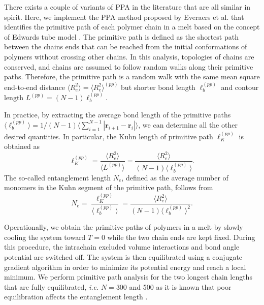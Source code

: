 \documentclass[pre,showpacs,notitlepage,twocolumn]{revtex4-1}
\begin{document}
There exists  a couple of variants of  PPA  in the literature \cite{Kroger,Hoy2009,PPAEveraers} that   are all similar in spirit. Here, we implement the  PPA method proposed by Everaers et al. \cite{PPAEveraers}
that  identifies the primitive path of each polymer chain in
a melt based on the concept of Edwards tube model \cite{Edwardstube}.
The primitive path is defined as the shortest path between the chains ends 
that can be  reached from the initial conformations of polymers without crossing other chains.  In this analysis, topologies of chains are conserved, and chains are assumed to follow
random walks along their primitive paths. Therefore, the primitive path is a random walk with the same mean square end-to-end distance $ \langle R_e^2 \rangle= \langle R_e^2 \rangle^{(pp)}$  but  shorter 
bond  length  $\ell_b^{(pp)}$ and contour length $L^{(pp)}=(N-1)\ell_b^{(pp)}$. 




In practice,  by extracting the average bond length of the primitive paths $\langle \ell_b^{(pp)} \rangle=1/ (N-1) \langle \sum_{i=1}^{N-1}|\mathbf{r}_{i+1}-\mathbf{r}_i|\rangle $, we can determine
all the other desired quantities.  In particular, the Kuhn 
length of primitive path $\ell_K^{(pp)}$ is obtained as
%
\begin{equation}
 \ell_K^{(pp)}=\frac{\langle R_e^2 \rangle}{\langle L^{(pp)} \rangle}=\frac{ \langle R_e^2 \rangle}{ (N-1) \langle \ell_b^{(pp)} \rangle}.
\label{eq:KuhnPP}
  \end{equation}
%
The so-called entanglement length $N_e$, defined as the average number of monomers in the Kuhn segment of the 
primitive path,  follows from 
%
\begin{equation}
N_{e}=  \frac{\ell_K^{(pp)}}{\langle \ell_b^{(pp)}\rangle}= \frac{\langle R_e^2 \rangle}{(N-1) \langle \ell_b^{(pp)}  \rangle^2 }.
 \end{equation}
%


Operationally,  we  obtain the primitive paths of polymers in a melt  by slowly cooling the system toward $T = 0$ while  the two chain ends are kept fixed. During this procedure, the intrachain excluded volume interactions and  bond angle 
potential are switched off.  The system is then equilibrated using a conjugate gradient algorithm in order to minimize its potential energy and reach a local minimum. We perform primitive path analysis for
the two longest chain lengths that are fully equilibrated, {\it i.e.} $N=300$ and 500 as it is known that poor equilibration affects the entanglement length \cite{Hoy2009}.
\end{document}
